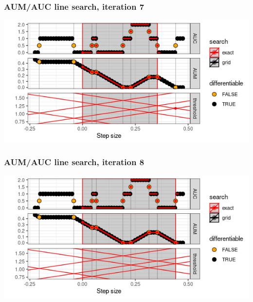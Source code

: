 \begin{frame}
  \frametitle{AUM/AUC line search, iteration 7}
  \includegraphics[width=\textwidth]{figure-line-search-example-7}
\end{frame}


\begin{frame}
  \frametitle{AUM/AUC line search, iteration 8}
  \includegraphics[width=\textwidth]{figure-line-search-example-8}
\end{frame}
